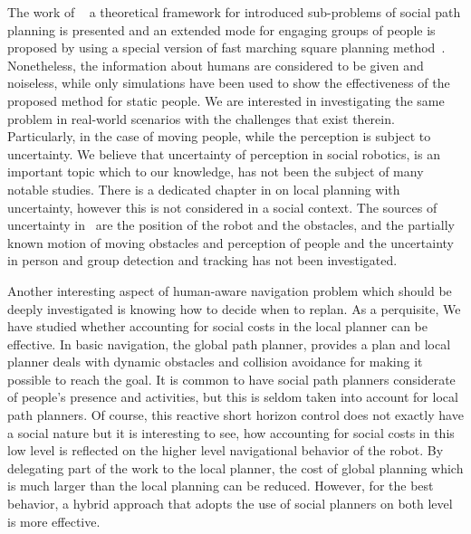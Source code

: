 The work of ~\cite{gomez2014fast} a theoretical framework for introduced sub-problems of social path planning is presented and an extended mode for engaging groups of people is proposed by using a special version of fast marching square planning method~\cite{valero2013fast}. Nonetheless, the information about humans are considered to be given and noiseless, while only simulations have been used to show the effectiveness of the proposed method for static people. We are interested in investigating the same problem in real-world scenarios with the challenges that exist therein. Particularly, in the case of moving people, while the perception is subject to uncertainty. 
We believe that uncertainty of perception in social robotics, is an important topic which to our knowledge, has not been the subject of many notable studies. There is a dedicated chapter in \cite{correa2014uncertainty} on local planning with uncertainty, however this is not considered in a social context. The sources of uncertainty in~\cite{correa2014uncertainty} are the position of the robot and the obstacles, and the partially known motion of moving obstacles and perception of people and the uncertainty in person and group detection and tracking has not been investigated.

Another interesting aspect of human-aware navigation problem which should be deeply investigated is knowing how to decide when to replan. As a perquisite, We have studied whether accounting for social costs in the local planner can be effective. In basic navigation, the global path planner, provides a plan and local planner deals with dynamic obstacles and collision avoidance for making it possible to reach the goal. It is common to have social path planners considerate of people's presence and activities, but this is seldom taken into account for local path planners. Of course, this reactive short horizon control does not exactly have a social nature but it is interesting to see, how accounting for social costs in this low level is reflected on the higher level navigational behavior of the robot. By delegating part of the work to the local planner, the cost of global planning which is much larger than the local planning can be reduced. However, for the best behavior, a hybrid approach that adopts the use of social planners on both level is more effective.    
